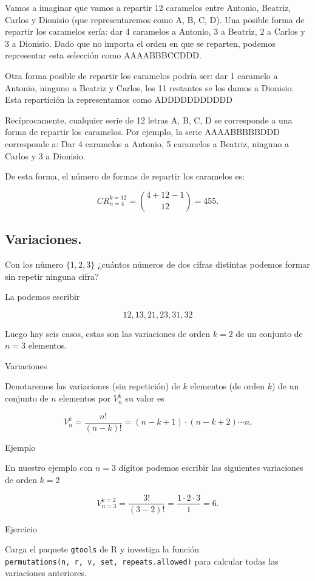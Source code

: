 \documentclass[
  letterpaper,
  DIV=11,
  numbers=noendperiod]{scrreprt}
\begin{document}
Vamos a imaginar que vamos a repartir 12 caramelos entre Antonio,
Beatriz, Carlos y Dionisio (que representaremos como A, B, C, D). Una
posible forma de repartir los caramelos sería: dar 4 caramelos a
Antonio, 3 a Beatriz, 2 a Carlos y 3 a Dionisio. Dado que no importa el
orden en que se reparten, podemos representar esta selección como
AAAABBBCCDDD.

Otra forma posible de repartir los caramelos podría ser: dar 1 caramelo
a Antonio, ninguno a Beatriz y Carlos, los 11 restantes se los damos a
Dionisio. Esta repartición la representamos como ADDDDDDDDDDD

Recíprocamente, cualquier serie de 12 letras A, B, C, D se corresponde a
una forma de repartir los caramelos. Por ejemplo, la serie AAAABBBBBDDD
corresponde a: Dar 4 caramelos a Antonio, 5 caramelos a Beatriz, ninguno
a Carlos y 3 a Dionisio.

De esta forma, el número de formas de repartir los caramelos es:

\[CR_{n=4}^{k=12} = \binom{4+12-1}{12}=455.\]

\subsection{Variaciones.}\label{variaciones.}

Con los número \(\{1,2,3\}\) ¿cuántos números de dos cifras distintas
podemos formar sin repetir ninguna cifra?

La podemos escribir

\[12,13,21,23,31,32\]

Luego hay seis casos, estas son las variaciones de orden \(k=2\) de un
conjunto de \(n=3\) elementos.

Variaciones

Denotaremos las variaciones (sin repetición) de \(k\) elementos (de
orden \(k\)) de un conjunto de \(n\) elementos por \(V_n^k\) su valor es

\[
V_n^k=\frac{n!}{(n-k)!}=(n-k+1)\cdot (n-k+2)\cdots n.
\]

Ejemplo

En nuestro ejemplo con \(n=3\) dígitos podemos escribir las siguientes
variaciones de orden \(k=2\)

\[
V^{k=2}_{n=3}=\frac{3!}{(3-2)!}=\frac{1\cdot 2\cdot 3}{1}=6.
\]

Ejercicio

Carga el paquete \texttt{gtools} de R y investiga la función
\texttt{permutations(n,\ r,\ v,\ set,\ repeats.allowed)} para calcular
todas las variaciones anteriores.
\end{document}
